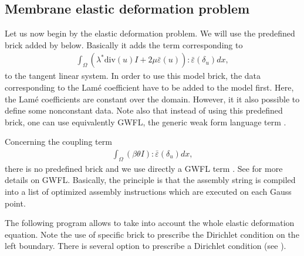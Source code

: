 \documentclass[a4paper,11pt,english]{sphinxmanual}
\begin{document}
\subsection{Membrane elastic deformation problem}
\label{\detokenize{tutorial/thermo_coupling:membrane-elastic-deformation-problem}}
\sphinxAtStartPar
Let us now begin by the elastic deformation problem. We will use the predefined brick added by  below. Basically it adds the term corresponding to
\begin{equation*}
\begin{split}\int_{\Omega} (\lambda^* \mbox{div}(u) I + 2\mu \bar{\varepsilon}(u)):\bar{\varepsilon}(\delta_u)dx,\end{split}
\end{equation*}
\sphinxAtStartPar
to the tangent linear system. In order to use this model brick, the data corresponding to the Lamé coefficient have to be added to the model first. Here, the Lamé coefficients are constant over the domain. However, it it also possible to define some non\sphinxhyphen{}constant data. Note also that instead of using this predefined brick, one can use equivalently GWFL, the generic weak form language term .

\sphinxAtStartPar
Concerning the coupling term
\begin{equation*}
\begin{split}\int_{\Omega} (\beta\theta I) :\bar{\varepsilon}(\delta_u)dx,\end{split}
\end{equation*}
\sphinxAtStartPar
there is no predefined brick and we use directly a GWFL term . See  for more details on GWFL. Basically, the principle is that the assembly string is compiled into a list of optimized assembly instructions which are executed on each Gauss point.

\sphinxAtStartPar
The following program allows to take into account the whole elastic deformation equation. Note the use of specific brick to prescribe the Dirichlet condition on the left boundary. There is several option to prescribe a Dirichlet condition (see ).
\end{document}
